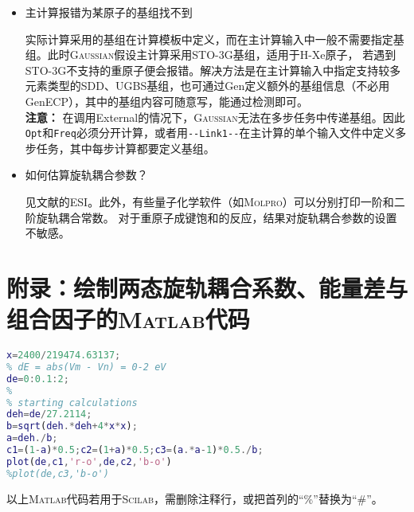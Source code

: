 \documentclass[UTF8]{ctexart}
\begin{document}
\begin{itemize}
\item 主计算报错为某原子的基组找不到

  实际计算采用的基组在计算模板中定义，而在主计算输入中一般不需要指定基组。此时\textsc{Gaussian}假设主计算采用STO-3G基组，适用于H-Xe原子，
  若遇到STO-3G不支持的重原子便会报错。解决方法是在主计算输入中指定支持较多元素类型的\textsf{SDD}、\textsf{UGBS}基组，也可通过\textsf{Gen}定义额外的基组信息（不必用\textsf{GenECP}），其中的基组内容可随意写，能通过检测即可。\\
  \textbf{注意：} 在调用\textsf{External}的情况下，\textsc{Gaussian}无法在多步任务中传递基组。因此\verb|Opt|和\verb|Freq|必须分开计算，或者用\verb|--Link1--|在主计算的单个输入文件中定义多步任务，其中每步计算都要定义基组。

\item 如何估算旋轨耦合参数？

见文献\cite{ref3}的ESI。此外，有些量子化学软件（如\textsc{Molpro}）可以分别打印一阶和二阶旋轨耦合常数。
对于重原子成键饱和的反应，结果对旋轨耦合参数的设置不敏感。

%

\end{itemize}

\newpage

\appendix

\section{附录：绘制两态旋轨耦合系数、能量差与组合因子的\textsc{Matlab}代码}

\begin{lstlisting}[language=matlab]
% chi = 2400 cm-1
x=2400/219474.63137;
% dE = abs(Vm - Vn) = 0-2 eV
de=0:0.1:2;
%
% starting calculations
deh=de/27.2114;
b=sqrt(deh.*deh+4*x*x);
a=deh./b;
c1=(1-a)*0.5;c2=(1+a)*0.5;c3=(a.*a-1)*0.5./b;
plot(de,c1,'r-o',de,c2,'b-o')
%plot(de,c3,'b-o')
\end{lstlisting}

以上\textsc{Matlab}代码若用于\textsc{Scilab}，需删除注释行，或把首列的“\%”替换为“\#”。
\end{document}
